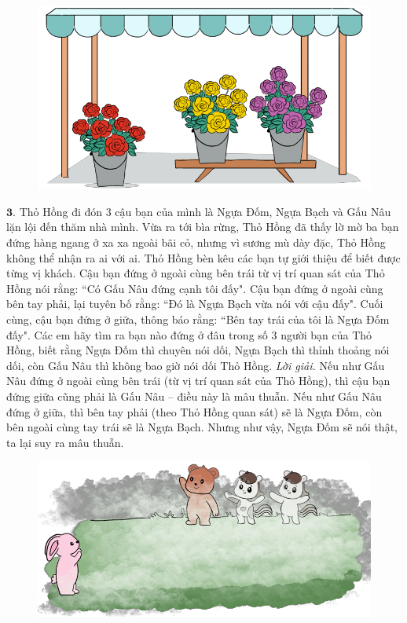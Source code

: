\begin{multicols}{2}
	\begin{figure}[H]
		\centering
		\vspace*{-10pt}
		\captionsetup{labelformat= empty, justification=centering}
		\includegraphics[width=0.8\linewidth]{Pi9_bai2}
		\vspace*{-10pt}
	\end{figure}
	$\pmb{3.}$ Thỏ Hồng đi đón $3$ cậu bạn của mình là Ngựa Đốm, Ngựa Bạch và Gấu Nâu lặn lội đến thăm nhà mình. Vừa ra tới bìa rừng, Thỏ Hồng đã thấy lờ mờ ba bạn đứng hàng ngang ở xa xa ngoài bãi cỏ, nhưng vì sương mù dày đặc, Thỏ Hồng không thể nhận ra ai với ai. Thỏ Hồng bèn kêu các bạn tự giới thiệu để biết được từng vị khách. Cậu bạn đứng ở ngoài cùng bên trái từ vị trí quan sát của Thỏ Hồng nói rằng: ``Có Gấu Nâu đứng cạnh tôi đấy". Cậu bạn đứng ở ngoài cùng bên tay phải, lại tuyên bố rằng: ``Đó là Ngựa Bạch vừa nói với cậu đấy". Cuối cùng, cậu bạn đứng ở giữa, thông báo rằng: ``Bên tay trái của tôi là Ngựa Đốm đấy". Các em hãy tìm ra bạn nào đứng ở đâu trong số $3$ người bạn của Thỏ Hồng, biết rằng Ngựa Đốm thì chuyên nói dối, Ngựa Bạch thì thỉnh thoảng nói dối, còn Gấu Nâu thì không bao giờ nói dối Thỏ Hồng.
	\vskip 0.1cm
	\textit{Lời giải.} Nếu như Gấu Nâu đứng ở ngoài cùng bên trái (từ vị trí quan sát của Thỏ Hồng), thì cậu bạn đứng giữa cũng phải là Gấu Nâu -- điều này là mâu thuẫn. Nếu như Gấu Nâu đứng ở giữa, thì bên tay phải (theo Thỏ Hồng quan sát) sẽ là Ngựa Đốm, còn bên ngoài cùng tay trái sẽ là Ngựa Bạch. Nhưng như vậy, Ngựa Đốm sẽ nói thật, ta lại suy ra mâu thuẫn.
	\begin{figure}[H]
		\centering
		\vspace*{-10pt}
		\captionsetup{labelformat= empty, justification=centering}
		\includegraphics[width=0.85\linewidth]{Pi9_bai3}

\end{figure}
\end{multicols}
